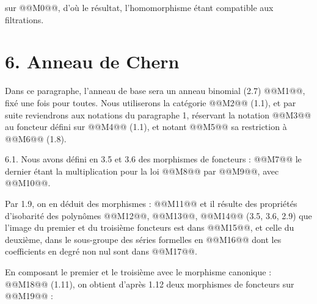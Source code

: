 
sur @@M0@@, d'où le
résultat, l'homomorphisme étant compatible aux filtrations.

\section*{6. Anneau de Chern}

Dans ce paragraphe, l'anneau de base sera un anneau binomial (2.7) @@M1@@, fixé une fois pour toutes. Nous utiliserons la catégorie @@M2@@ (1.1), et par suite reviendrons aux notations du paragraphe 1, réservant la notation @@M3@@ au foncteur défini sur @@M4@@ (1.1), et notant @@M5@@ sa restriction à @@M6@@ (1.8).

6.1. Nous avons défini en 3.5 et 3.6 des morphismes de foncteurs :
@@M7@@
le dernier étant la multiplication pour la loi @@M8@@ par @@M9@@, avec @@M10@@.

Par 1.9, on en déduit des morphismes :
@@M11@@
et il résulte des propriétés d'isobarité des polynômes @@M12@@, @@M13@@, @@M14@@ (3.5, 3.6, 2.9) que l'image du premier et du troisième foncteurs est dans @@M15@@, et celle du deuxième, dans le sous-groupe des séries formelles en @@M16@@ dont les coefficients en degré non nul sont dans @@M17@@.

En composant le premier et le troisième avec le morphisme canonique : @@M18@@ (1.11), on obtient d'après 1.12 deux morphismes de
foncteurs sur @@M19@@ :
